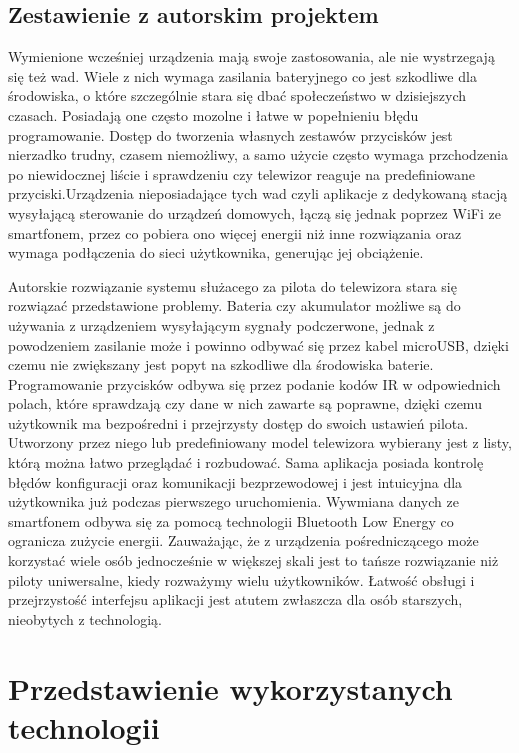 \documentclass[12pt,twoside]{article}
\begin{document}
\subsection{Zestawienie z autorskim projektem}
{Wymienione wcześniej urządzenia mają swoje zastosowania, ale nie wystrzegają się też wad. Wiele z nich wymaga zasilania bateryjnego co jest szkodliwe dla środowiska, o które szczególnie stara się dbać społeczeństwo w dzisiejszych czasach. Posiadają one często mozolne i łatwe w popełnieniu błędu programowanie. Dostęp do tworzenia własnych zestawów przycisków jest nierzadko trudny, czasem niemożliwy, a samo użycie często wymaga przchodzenia po niewidocznej liście i sprawdzeniu czy telewizor reaguje na predefiniowane przyciski.Urządzenia nieposiadające tych wad czyli aplikacje z dedykowaną stacją wysyłającą sterowanie do urządzeń domowych, łączą się jednak poprzez WiFi ze smartfonem, przez co pobiera ono więcej energii niż inne rozwiązania oraz wymaga podłączenia do sieci użytkownika, generując jej obciążenie.

   Autorskie rozwiązanie systemu służacego za pilota do telewizora stara się rozwiązać przedstawione problemy. Bateria czy akumulator możliwe są do używania z urządzeniem wysyłającym sygnały podczerwone, jednak z powodzeniem zasilanie może i powinno odbywać się przez kabel microUSB, dzięki czemu nie zwiększany jest popyt na szkodliwe dla środowiska baterie. Programowanie przycisków odbywa się przez podanie kodów IR w odpowiednich polach, które sprawdzają czy dane w nich zawarte są poprawne, dzięki czemu użytkownik ma bezpośredni i przejrzysty dostęp do swoich ustawień pilota. Utworzony przez niego lub predefiniowany model telewizora wybierany jest z listy, którą można łatwo przeglądać i rozbudować. Sama aplikacja posiada kontrolę błędów konfiguracji oraz komunikacji bezprzewodowej i jest intuicyjna dla użytkownika już podczas pierwszego uruchomienia. Wywmiana danych ze smartfonem odbywa się za pomocą technologii Bluetooth Low Energy co ogranicza zużycie energii. Zauważając, że z urządzenia pośredniczącego może korzystać wiele osób jednocześnie w większej skali jest to tańsze rozwiązanie niż piloty uniwersalne, kiedy rozważymy wielu użytkowników. Łatwość obsługi i przejrzystość interfejsu aplikacji jest atutem zwłaszcza dla osób starszych, nieobytych z technologią.
}
\clearpage
\section{Przedstawienie wykorzystanych technologii}
\end{document}
